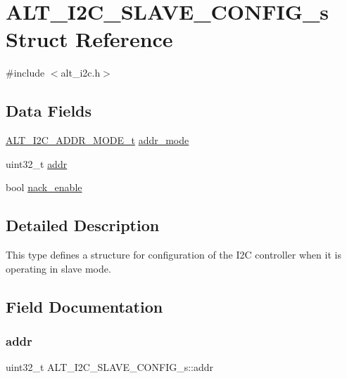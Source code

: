 \hypertarget{structALT__I2C__SLAVE__CONFIG__s}{}\section{A\+L\+T\+\_\+\+I2\+C\+\_\+\+S\+L\+A\+V\+E\+\_\+\+C\+O\+N\+F\+I\+G\+\_\+s Struct Reference}
\label{structALT__I2C__SLAVE__CONFIG__s}


{\ttfamily \#include $<$alt\+\_\+i2c.\+h$>$}

\subsection*{Data Fields}
\begin{DoxyCompactItemize}
\item 
\mbox{\hyperlink{group__ALT__I2C_gacaf56449440abffe69a7941f24f9bf5b}{A\+L\+T\+\_\+\+I2\+C\+\_\+\+A\+D\+D\+R\+\_\+\+M\+O\+D\+E\+\_\+t}} \mbox{\hyperlink{structALT__I2C__SLAVE__CONFIG__s_a4144df0aacaf384eecee950ff8f903a1}{addr\+\_\+mode}}
\item 
uint32\+\_\+t \mbox{\hyperlink{structALT__I2C__SLAVE__CONFIG__s_a9e33d2fc1b3fd174271728fab20cf40f}{addr}}
\item 
bool \mbox{\hyperlink{structALT__I2C__SLAVE__CONFIG__s_a297845dd3c03060765e4993dbf96f628}{nack\+\_\+enable}}
\end{DoxyCompactItemize}


\subsection{Detailed Description}
This type defines a structure for configuration of the I2C controller when it is operating in slave mode. 

\subsection{Field Documentation}
\mbox{\label{structALT__I2C__SLAVE__CONFIG__s_a9e33d2fc1b3fd174271728fab20cf40f}} 
\subsubsection{\texorpdfstring{addr}{addr}}
{\footnotesize\ttfamily uint32\+\_\+t A\+L\+T\+\_\+\+I2\+C\+\_\+\+S\+L\+A\+V\+E\+\_\+\+C\+O\+N\+F\+I\+G\+\_\+s\+::addr}

